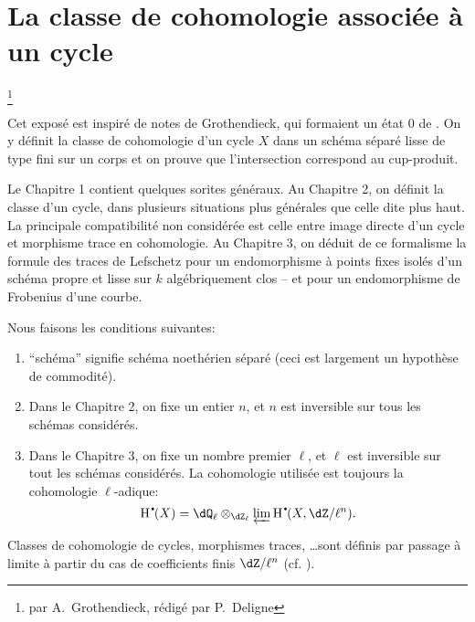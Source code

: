 
\chapter{La classe de cohomologie associée à un cycle}\label{IV}
\footnote{par A.\ Grothendieck, rédigé par P.\ Deligne}




Cet exposé est inspiré de notes de Grothendieck, qui formaient un état 0 
de \cite[IV]{sga5}. On y définit la classe de cohomologie d'un cycle $X$ dans 
un schéma séparé lisse de type fini sur un corps et on prouve que 
l'intersection correspond au cup-produit.

Le Chapitre 1 contient quelques sorites généraux. Au Chapitre 2, on 
définit la classe d'un cycle, dans plusieurs situations plus générales 
que celle dite plus haut. La principale compatibilité non considérée est 
celle entre image directe d'un cycle et morphisme trace en cohomologie. Au 
Chapitre 3, on déduit de ce formalisme la formule des traces de Lefschetz pour 
un endomorphisme à points fixes isolés d'un schéma propre et lisse sur $k$ 
algébriquement clos -- et pour un endomorphisme de Frobenius d'une courbe. 

Nous faisons les conditions suivantes:
\begin{enumerate}[\indent 1)]
  \item ``schéma'' signifie schéma noethérien séparé (ceci est 
    largement un hypothèse de commodité).
  \item Dans le Chapitre 2, on fixe un entier $n$, et $n$ est inversible sur 
    tous les schémas considérés.
  \item Dans le Chapitre 3, on fixe un nombre premier $\ell$, et $\ell$ est 
    inversible sur tout les schémas considérés. La cohomologie utilisée 
    est toujours la cohomologie $\ell$-adique:
    \[
      \h^\bullet(X) = \dQ_\ell\otimes_{\dZ_\ell} \varprojlim \h^\bullet(X,\dZ/\ell^n) \text{.}
    \]
\end{enumerate}
Classes de cohomologie de cycles, morphismes traces, \ldots sont définis par 
passage à limite à partir du cas de coefficients finis $\dZ/\ell^n$ (cf. 
\cite[VI]{sga5}).





















